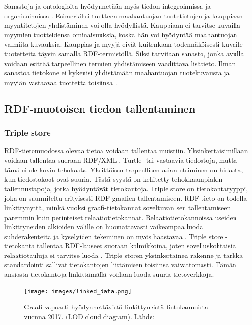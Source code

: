 \documentclass[finnish, 12pt, a4paper, elec, utf8, pdfa, online]{aaltothesis}
\begin{document}
{Sanastoja ja ontologioita hyödynnetään myös tiedon integroinnissa ja organisoinnissa \cite{vocabulary}. Esimerkiksi tuotteen maahantuojan tuotetietojen ja kauppiaan myyntitetojen yhdistäminen voi olla hyödyllistä. Kauppiaan ei tarvitse kuvailla myymien tuotteidensa ominaisuuksia, koska hän voi hyödyntää maahantuojan valmiita kuvauksia. Kauppias ja myyjä eivät kuitenkaan todennäköisesti kuvaile tuotetteita täysin samalla RDF-termistöllä. Siksi tarvitaan sanasto, jonka avulla voidaan esittää tarpeellinen termien yhdistämiseen vaadittava lisätieto. Ilman sanastoa tietokone ei kykenisi yhdistämään maahantuojan tuotekuvausta ja myyjän vastaavaa tuottetta toisiinsa \cite{vocabulary}.


\subsection{RDF-muotoisen tiedon tallentaminen}


\subsubsection{Triple store}
RDF-tietomuodossa olevaa tietoa voidaan tallentaa muistiin. Yksinkertaisimillaan voidaan tallentaa suoraan RDF/XML-, Turtle- tai vastaavia tiedostoja, mutta tämä ei ole kovin tehokasta. Yksittäisen tarpeellisen asian etsiminen on hidasta, kun tiedostokoot ovat suuria. Tästä syystä on kehitetty tehokkaampiakin tallennustapoja, jotka hyödyntävät tietokantoja. Triple store on tietokantatyyppi, joka on suunniteltu erityisesti RDF-graafien tallentamiseen. RDF-tieto on todella linkittynyttä, minkä vuoksi graafi-tietokannat soveltuvan sen tallentamiseen paremmin kuin perinteiset relaatiotietokannat. Relaatiotietokannoissa useiden linkittyneiden alkioiden välille on huomattavasti vaikeampaa luoda suhderakenteita ja kyselyiden tekeminen on myös haastavaa \cite{triplestore2}. Triple store -tietokanta tallentaa RDF-lauseet suoraan kolmikkoina, joten sovelluskohtaisia relaatiotauluja ei tarvitse luoda \cite{triplestore}. Triple storen yksinkertainen rakenne ja tarkka standardointi sallivat tietokantojen liittämisen toisiinsa vaivattomasti. Tämän ansiosta tietokantoja linkittämällä voidaan luoda suuria tietoverkkoja.


\begin{figure}[htb]
\centering
\texttt{[image: images/linked\_data.png]}
\caption{Graafi vapaasti hyödynnettävistä linkittyneistä tietokannoista vuonna 2017. (LOD cloud diagram). Lähde: \cite{LOD_cloud} \label{images/linked_data}}
\end{figure}
\clearpage

}
\end{document}
